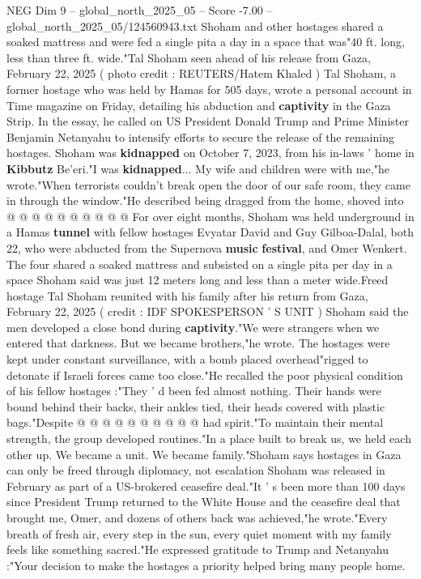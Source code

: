 \begin{textsample}{NEG Dim 9 – global\_north\_2025\_05 – Score -7.00 – global\_north\_2025\_05/124560943.txt}  \label{ex:f9_neg_173}
Shoham and other hostages shared a soaked mattress and were fed a single pita a day in a space that was"40 ft. long, less than three ft. wide."Tal Shoham seen ahead of his release from Gaza, February 22, 2025 ( photo credit : REUTERS/Hatem Khaled ) Tal Shoham, a former hostage who was held by Hamas for 505 days, wrote a personal account in Time magazine on Friday, detailing his abduction and \textbf{captivity} in the Gaza Strip.
In the essay, he called on US President Donald Trump and Prime Minister Benjamin Netanyahu to intensify efforts to secure the release of the remaining hostages.
Shoham was \textbf{kidnapped} on October 7, 2023, from his in-laws ' home in \textbf{Kibbutz} Be'eri."I was \textbf{kidnapped}...
My wife and children were with me,"he wrote."When terrorists couldn't break open the door of our safe room, they came in through the window."He described being dragged from the home, shoved into @ @ @ @ @ @ @ @ @ @ For over eight months, Shoham was held underground in a Hamas \textbf{tunnel} with fellow hostages Evyatar David and Guy Gilboa-Dalal, both 22, who were abducted from the Supernova \textbf{music} \textbf{festival}, and Omer Wenkert.
The four shared a soaked mattress and subsisted on a single pita per day in a space Shoham said was just 12 meters long and less than a meter wide.Freed hostage Tal Shoham reunited with his family after his return from Gaza, February 22, 2025 ( credit : IDF SPOKESPERSON ' S UNIT ) Shoham said the men developed a close bond during \textbf{captivity}."We were strangers when we entered that darkness.
But we became brothers,"he wrote.
The hostages were kept under constant surveillance, with a bomb placed overhead"rigged to detonate if Israeli forces came too close."He recalled the poor physical condition of his fellow hostages :"They ' d been fed almost nothing.
Their hands were bound behind their backs, their ankles tied, their heads covered with plastic bags."Despite @ @ @ @ @ @ @ @ @ @ had spirit."To maintain their mental strength, the group developed routines."In a place built to break us, we held each other up.
We became a unit.
We became family."Shoham says hostages in Gaza can only be freed through diplomacy, not escalation Shoham was released in February as part of a US-brokered ceasefire deal."It ' s been more than 100 days since President Trump returned to the White House and the ceasefire deal that brought me, Omer, and dozens of others back was achieved,"he wrote."Every breath of fresh air, every step in the sun, every quiet moment with my family feels like something sacred."He expressed gratitude to Trump and Netanyahu :"Your decision to make the hostages a priority helped bring many people home.

\end{textsample}
